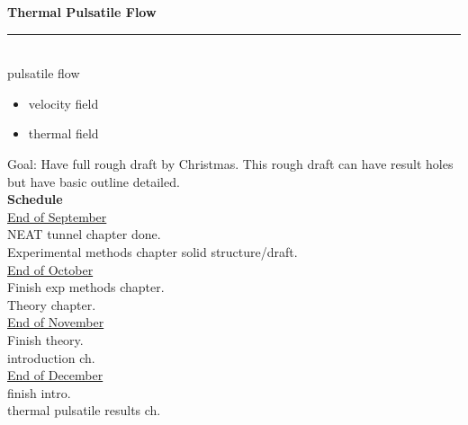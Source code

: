 \documentclass[11pt]{article}
\begin{document}
{\bf Thermal Pulsatile Flow}
\vspace{-.5cm}
\newline
\noindent\rule{8cm}{0.4pt}\\
pulsatile flow
\begin{itemize}
\item velocity field
\item thermal field
\end{itemize}


\newpage
Goal: Have full rough draft by Christmas. 
This rough draft can have result holes but have basic outline detailed.\\
{\bf Schedule}\\
\underline{End of September}\\
NEAT tunnel chapter done.\\
Experimental methods chapter solid structure/draft.\\

\underline{End of October}\\
Finish exp methods chapter.\\
Theory chapter.\\

\underline{End of November}\\
Finish theory.\\
introduction ch.\\

\underline{End of December}\\
finish intro.\\
thermal pulsatile results ch.\\
\end{document}
